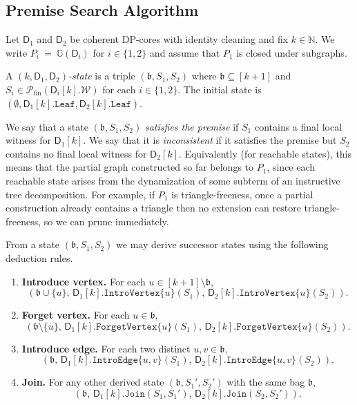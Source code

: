 \documentclass[11pt,a4paper]{article}
\newcommand{\treewidthvalue}{k}
\newcommand{\N}{\mathbb{N}}
\newcommand{\abag}{\mathfrak{b}}
\newcommand{\introvertextype}[1]{\mathtt{IntroVertex}\{#1\}}
\newcommand{\forgetvertextype}[1]{\mathtt{ForgetVertex}\{#1\}}
\newcommand{\jointype}{\mathtt{Join}}
\newcommand{\introedgegeneric}[2]{\mathtt{IntroEdge}\{#1,#2\}}
\newcommand{\initialsetgeneric}{\mathtt{Leaf}}
\newcommand{\defeq}{~\dot{=}~}
\newcommand{\vertexone}{u}
\newcommand{\vertextwo}{v}
\newcommand{\allwitnesses}{\mathcal{W}}
\newcommand{\finitepowerset}[1]{\mathcal{P}_{\mathrm{fin}}(#1)}
\newcommand{\dpcoregraphproperty}[1]{\mathbb{G}(#1)}
\newcommand{\dpcore}{\mathsf{D}}
\newcommand{\witnessset}{S}
\begin{document}
\subsection{Premise Search Algorithm}
\label{section:premise-search-appendix}

Let $\dpcore_1$ and $\dpcore_2$ be coherent DP-cores with identity cleaning and fix $\treewidthvalue\in \N$. We write $P_i \defeq \dpcoregraphproperty{\dpcore_i}$ for $i\in\{1,2\}$ and assume that $P_1$ is closed under subgraphs.

A \emph{$(\treewidthvalue,\dpcore_1,\dpcore_2)$-state} is a triple $(\abag,\witnessset_1,\witnessset_2)$ where $\abag\subseteq [\treewidthvalue+1]$ and $\witnessset_i \in \finitepowerset{\dpcore_i[\treewidthvalue].\allwitnesses}$ for each $i\in\{1,2\}$. The initial state is $(\emptyset,\dpcore_1[\treewidthvalue].\initialsetgeneric,\dpcore_2[\treewidthvalue].\initialsetgeneric)$.

We say that a state $(\abag,\witnessset_1,\witnessset_2)$ \emph{satisfies the premise} if $\witnessset_1$ contains a final local witness for $\dpcore_1[\treewidthvalue]$. We say that it is \emph{inconsistent} if it satisfies the premise but $\witnessset_2$ contains no final local witness for $\dpcore_2[\treewidthvalue]$.
Equivalently (for reachable states), this means that the partial graph constructed so far belongs to $P_1$, since each reachable state arises from the dynamization of some subterm of an instructive tree decomposition.
For example, if $P_1$ is triangle-freeness, once a partial construction already contains a triangle then no extension can restore triangle-freeness, so we can prune immediately.

From a state $(\abag,\witnessset_1,\witnessset_2)$ we may derive successor states using the following deduction rules.
\begin{enumerate}
\item \textbf{Introduce vertex.} For each $\vertexone\in [\treewidthvalue+1]\setminus \abag$,
\[
(\abag\cup\{\vertexone\},\, \dpcore_1[\treewidthvalue].\introvertextype{\vertexone}(\witnessset_1),\, \dpcore_2[\treewidthvalue].\introvertextype{\vertexone}(\witnessset_2)).
\]
\item \textbf{Forget vertex.} For each $\vertexone\in \abag$,
\[
(\abag\setminus\{\vertexone\},\, \dpcore_1[\treewidthvalue].\forgetvertextype{\vertexone}(\witnessset_1),\, \dpcore_2[\treewidthvalue].\forgetvertextype{\vertexone}(\witnessset_2)).
\]
\item \textbf{Introduce edge.} For each two distinct $\vertexone,\vertextwo\in \abag$,
\[
(\abag,\, \dpcore_1[\treewidthvalue].\introedgegeneric{\vertexone}{\vertextwo}(\witnessset_1),\, \dpcore_2[\treewidthvalue].\introedgegeneric{\vertexone}{\vertextwo}(\witnessset_2)).
\]
\item \textbf{Join.} For any other derived state $(\abag,\witnessset_1',\witnessset_2')$ with the same bag $\abag$,
\[
(\abag,\, \dpcore_1[\treewidthvalue].\jointype(\witnessset_1,\witnessset_1'),\, \dpcore_2[\treewidthvalue].\jointype(\witnessset_2,\witnessset_2')).
\]
\end{enumerate}
\end{document}
